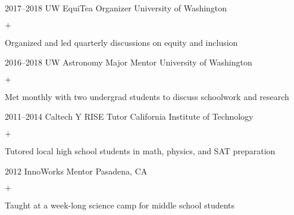 \documentclass[]{luger-cv} %
\begin{document}
\begin{entrylist}
\entry
{2017--2018}
{UW EquiTea Organizer}
{University of Washington}
{%
\vspace{-1em}
\begin{list}{$+$}{\cvlist}
\item Organized and led quarterly discussions on equity and inclusion
\end{list}
}


\entry
{2016--2018}
{UW Astronomy Major Mentor}
{University of Washington}
{%
\vspace{-1em}
\begin{list}{$+$}{\cvlist}
\item Met monthly with two undergrad students to discuss schoolwork and research
\end{list}
}


\ifdefined \onepage \else
\end{entrylist}
%
%
\begin{entrylist}
\fi


\entry
{2011--2014}
{Caltech Y RISE Tutor}
{California Institute of Technology}
{%
\vspace{-1em}
\begin{list}{$+$}{\cvlist}
\item Tutored local high school students in math, physics, and SAT preparation
\fi
\end{list}
}

%

\ifdefined \onepage \else
\entry
{2012}
{InnoWorks Mentor}
{Pasadena, CA}
{%
\vspace{-1em}
\begin{list}{$+$}{\cvlist}
\item Taught at a week-long science camp for middle school students
\end{list}
}
\fi


\end{entrylist}
\end{document}
